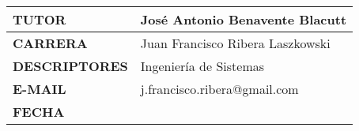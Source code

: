 {\begin{table}[h]
\begin{center}
\begin{tabular}{| >{\centering\arraybackslash}m{1.5in} | >{\centering\arraybackslash}m{3.5in} |}
\vspace{0.1cm}\textbf{TUTOR}  & José Antonio Benavente Blacutt \\ \hline
\vspace{0.1cm}\textbf{CARRERA}  & Juan Francisco Ribera Laszkowski \\ \hline
\vspace{0.1cm}\textbf{DESCRIPTORES}  & Ingeniería de Sistemas \\ \hline
\vspace{0.1cm}\textbf{E-MAIL}  & j.francisco.ribera@gmail.com \\ \hline
\vspace{0.1cm}\textbf{FECHA}  & 2016 \\ \hline

\end{tabular}
\label{tabular:UKJPNdata}
\end{center}
\end{table}

}

